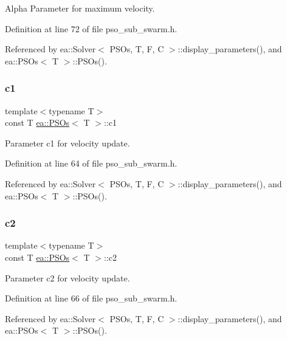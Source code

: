 Alpha Parameter for maximum velocity. 



Definition at line 72 of file pso\+\_\+sub\+\_\+swarm.\+h.



Referenced by ea\+::\+Solver$<$ P\+S\+Os, T, F, C $>$\+::display\+\_\+parameters(), and ea\+::\+P\+S\+Os$<$ T $>$\+::\+P\+S\+Os().

\mbox{\label{structea_1_1_p_s_os_ad714859d3155b4492fb01eb1664e7c65}} 
\subsubsection{\texorpdfstring{c1}{c1}}
{\footnotesize\ttfamily template$<$typename T$>$ \\
const T \hyperlink{structea_1_1_p_s_os}{ea\+::\+P\+S\+Os}$<$ T $>$\+::c1}



Parameter c1 for velocity update. 



Definition at line 64 of file pso\+\_\+sub\+\_\+swarm.\+h.



Referenced by ea\+::\+Solver$<$ P\+S\+Os, T, F, C $>$\+::display\+\_\+parameters(), and ea\+::\+P\+S\+Os$<$ T $>$\+::\+P\+S\+Os().

\mbox{\label{structea_1_1_p_s_os_a905b431f08e1617a0e30bdac1093927b}} 
\subsubsection{\texorpdfstring{c2}{c2}}
{\footnotesize\ttfamily template$<$typename T$>$ \\
const T \hyperlink{structea_1_1_p_s_os}{ea\+::\+P\+S\+Os}$<$ T $>$\+::c2}



Parameter c2 for velocity update. 



Definition at line 66 of file pso\+\_\+sub\+\_\+swarm.\+h.



Referenced by ea\+::\+Solver$<$ P\+S\+Os, T, F, C $>$\+::display\+\_\+parameters(), and ea\+::\+P\+S\+Os$<$ T $>$\+::\+P\+S\+Os().

